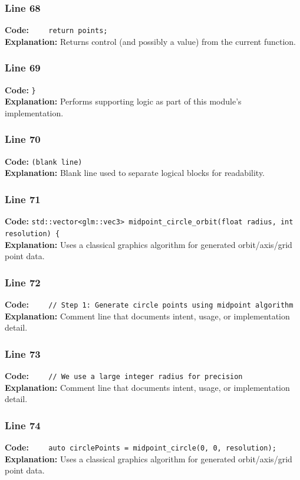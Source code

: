 \documentclass[11pt,a4paper]{article}
\begin{document}
\subsubsection*{Line 68}
\textbf{Code:} \verb|    return points;|\\
\textbf{Explanation:} Returns control (and possibly a value) from the current function.

\subsubsection*{Line 69}
\textbf{Code:} \verb|}|\\
\textbf{Explanation:} Performs supporting logic as part of this module's implementation.

\subsubsection*{Line 70}
\textbf{Code:} \texttt{(blank line)}\\
\textbf{Explanation:} Blank line used to separate logical blocks for readability.

\subsubsection*{Line 71}
\textbf{Code:} \verb|std::vector<glm::vec3> midpoint_circle_orbit(float radius, int resolution) {|\\
\textbf{Explanation:} Uses a classical graphics algorithm for generated orbit/axis/grid point data.

\subsubsection*{Line 72}
\textbf{Code:} \verb|    // Step 1: Generate circle points using midpoint algorithm|\\
\textbf{Explanation:} Comment line that documents intent, usage, or implementation detail.

\subsubsection*{Line 73}
\textbf{Code:} \verb|    // We use a large integer radius for precision|\\
\textbf{Explanation:} Comment line that documents intent, usage, or implementation detail.

\subsubsection*{Line 74}
\textbf{Code:} \verb|    auto circlePoints = midpoint_circle(0, 0, resolution);|\\
\textbf{Explanation:} Uses a classical graphics algorithm for generated orbit/axis/grid point data.
\end{document}

